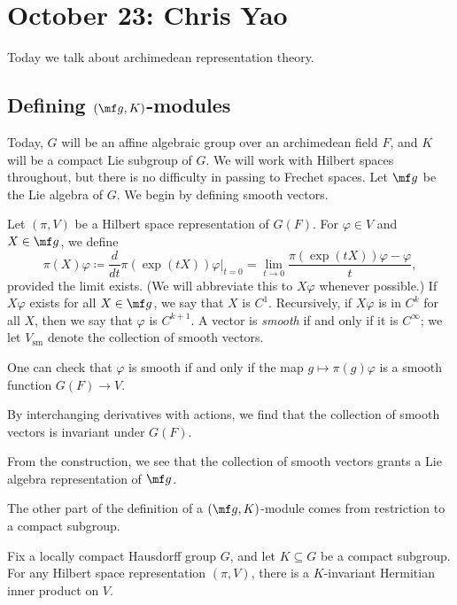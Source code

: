 \documentclass{article}
\begin{document}
\section{October 23: Chris Yao}
Today we talk about archimedean representation theory.

\subsection{Defining \texorpdfstring{$(\mf g,K)$}{ (g, K)}-modules}
Today, $G$ will be an affine algebraic group over an archimedean field $F$, and $K$ will be a compact Lie subgroup of $G$. We will work with Hilbert spaces throughout, but there is no difficulty in passing to Frechet spaces. Let $\mf g$ be the Lie algebra of $G$. We begin by defining smooth vectors.
\begin{definition}
	Let $(\pi,V)$ be a Hilbert space representation of $G(F)$. For $\varphi\in V$ and $X\in\mf g$, we define
	\[\pi(X)\varphi\coloneqq\frac d{dt}\pi(\exp(tX))\varphi\bigg|_{t=0}=\lim_{t\to0}\frac{\pi(\exp(tX))\varphi-\varphi}t,\]
	provided the limit exists. (We will abbreviate this to $X\varphi$ whenever possible.) If $X\varphi$ exists for all $X\in\mf g$, we say that $X$ is $C^1$. Recursively, if $X\varphi$ is in $C^k$ for all $X$, then we say that $\varphi$ is $C^{k+1}$. A vector is \textit{smooth} if and only if it is $C^\infty$; we let $V_{\mathrm{sm}}$ denote the collection of smooth vectors.
\end{definition}
\begin{remark}
	One can check that $\varphi$ is smooth if and only if the map $g\mapsto\pi(g)\varphi$ is a smooth function $G(F)\to V$.
\end{remark}
\begin{remark}
	By interchanging derivatives with actions, we find that the collection of smooth vectors is invariant under $G(F)$.
\end{remark}
\begin{remark}
	From the construction, we see that the collection of smooth vectors grants a Lie algebra representation of $\mf g$.
\end{remark}
The other part of the definition of a $(\mf g,K)$-module comes from restriction to a compact subgroup.
\begin{lemma}
	Fix a locally compact Hausdorff group $G$, and let $K\subseteq G$ be a compact subgroup. For any Hilbert space representation $(\pi,V)$, there is a $K$-invariant Hermitian inner product on $V$.
\end{lemma}
\end{document}
